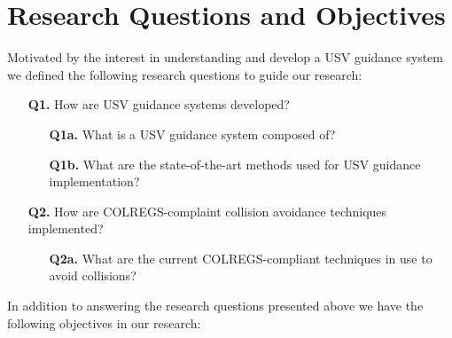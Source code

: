     \section{Research Questions and Objectives}
    \label{sec:Research_Questions_and_Objectives}

    
        Motivated by the interest in understanding and develop a \ac{USV} guidance system we defined the following research questions to guide our research:
        
        \begin{center}
        \begin{itemize}
        \item [\textbf{Q1.}] How are \ac{USV} guidance systems developed?
            \begin{itemize}
            \item [\textbf{Q1a.}] What is a \ac{USV} guidance system composed of?
            \item [\textbf{Q1b.}] What are the state-of-the-art methods used for \ac{USV} guidance implementation?
            \end{itemize}
        \item [\textbf{Q2.}] How are \ac{COLREGS}-complaint collision avoidance techniques implemented?
            \begin{itemize}
            \item [\textbf{Q2a.}] What are the current \ac{COLREGS}-compliant techniques in use to avoid collisions?
            \end{itemize}
        \end{itemize}
        \end{center}
        
        In addition to answering the research questions presented above we have the following objectives in our research:
        \newline
        
